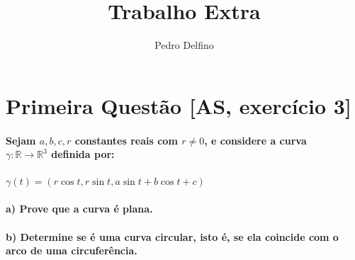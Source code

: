 \documentclass[fleqn]{article}
\title{Trabalho Extra}
\author{Pedro Delfino}
\begin{document}
\maketitle

\newpage

\section*{Primeira Questão [AS, exercício 3]} 

\paragraph{Sejam $a,b,c,r$ constantes reais com $r \neq 0$, e considere a curva \\ $\gamma: \mathbb{R}  \rightarrow \mathbb{R}^3 $ definida por:}

\begin{center}
$\gamma(t) = (r\cos t,r\sin t, a\sin t + b\cos t +c) $ 
\end{center}

\paragraph{a) Prove que a curva é plana.}
\paragraph{b) Determine se é uma curva circular, isto é, se ela coincide com o arco de uma circuferência. \\} 
\end{document}
